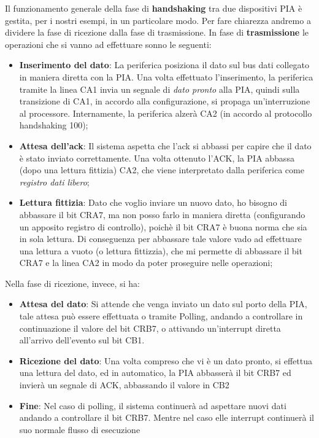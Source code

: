 Il funzionamento generale della fase di \textbf{handshaking} tra due dispositivi PIA è gestita, per i nostri esempi, in un particolare modo.
Per fare chiarezza andremo a dividere la fase di ricezione dalla fase di trasmissione.
In fase di \textbf{trasmissione} le operazioni che si vanno ad effettuare sonno le seguenti:
\begin{itemize}
    \item \textbf{Inserimento del dato}: La periferica posiziona il dato sul bus dati collegato in maniera diretta con la PIA. Una volta effettuato l'inserimento, la periferica tramite la linea CA1 invia un segnale di \textit{dato pronto} alla PIA, quindi sulla transizione di CA1, in accordo alla configurazione, si propaga un'interruzione al processore. Internamente, la periferica alzerà CA2 (in accordo al protocollo handshaking 100);
    \item \textbf{Attesa dell'ack}: Il sistema aspetta che l'ack si abbassi per capire che il dato è stato inviato correttamente. Una volta ottenuto l'ACK, la PIA abbassa (dopo una lettura fittizia) CA2, che viene interpretato dalla periferica come \textit{registro dati libero};
    \item \textbf{Lettura fittizia}: Dato che voglio inviare un nuovo dato, ho bisogno di abbassare il bit CRA7, ma non posso farlo in maniera diretta (configurando un apposito registro di controllo), poichè il bit CRA7 è buona norma che sia in sola lettura. Di conseguenza per abbassare tale valore vado ad effettuare una lettura a vuoto (o lettura fittizzia), che mi permette di abbassare il bit CRA7 e la linea CA2 in modo da poter proseguire nelle operazioni;
\end{itemize}

Nella fase di ricezione, invece, si ha:
\begin{itemize}
    \item \textbf{Attesa del dato}: Si attende che venga inviato un dato sul porto della PIA, tale attesa può essere effettuata o tramite Polling, andando a controllare in continuazione il valore del bit CRB7, o attivando un'interrupt diretta all'arrivo dell'evento sul bit CB1.
    
    \item \textbf{Ricezione del dato}: Una volta compreso che vi è un dato pronto, si effettua una lettura del dato, ed in automatico, la PIA abbasserà il bit CRB7 ed invierà un segnale di ACK, abbassando il valore in CB2

    \item \textbf{Fine}: Nel caso di polling, il sistema continuerà ad aspettare nuovi dati andando a controllare il bit CRB7. Mentre nel caso elle interrupt continuerà il suo normale flusso di esecuzione
\end{itemize}

